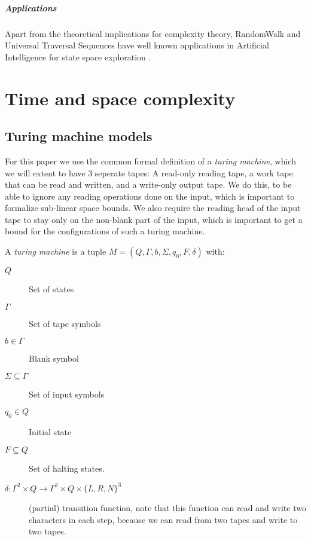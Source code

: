 \paragraph{Applications}\label{applications}

Apart from the theoretical implications for complexity theory,
RandomWalk and Universal Traversal Sequences have well known
applications in Artificial Intelligence for state space exploration
.

\chapter{Time and space complexity}\label{time-and-space-complexity}

\section{Turing machine models}\label{turing-machine-models}

For this paper we use the common formal definition of a \emph{turing
machine}, which we will extent to have 3 seperate tapes: A read-only
reading tape, a work tape that can be read and written, and a write-only
output tape. We do this, to be able to ignore any reading operations
done on the input, which is important to formalize sub-linear space
bounds. We also require the reading head of the input tape to stay only
on the non-blank part of the input, which is important to get a bound
for the configurations of such a turing machine.

A \emph{turing machine} is a tuple
$M = \left( Q, \Gamma, b, \Sigma, q_0, F, \delta \right)$ with:

\begin{description}
\item[$Q$]
Set of states
\item[$\Gamma$]
Set of tape symbols
\item[$b \in \Gamma$]
Blank symbol
\item[$\Sigma \subseteq \Gamma$]
Set of input symbols
\item[$q_0 \in Q$]
Initial state
\item[$F \subseteq Q$]
Set of halting states.
\item[$\delta : \Gamma^2 \times Q \longrightarrow \Gamma^2 \times Q \times \{L, R, N\}^3$]
(partial) transition function, note that this function can read and
write two characters in each step, because we can read from two tapes
and write to two tapes.
\end{description}

